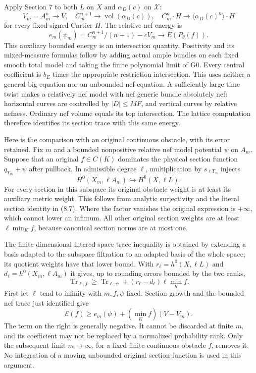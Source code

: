 \documentclass[10pt]{article}
\newcommand{\vol}{\operatorname{vol}}
\begin{document}
Apply Section 7 to both $L$ on $X$ and $\alpha_D(c)$ on $\mathcal X$:
\[
 V_m=A_m^n\to V,\quad C_m^{n+1}\to\vol(\alpha_D(c)),\quad
 C_m^n\cdot H\to\langle\alpha_D(c)^n\rangle\cdot H   \tag{8.5}
\]
for every fixed signed Cartier $H$. The relative nef energy is
\[
 e_m(\psi_m)=C_m^{n+1}/(n+1)-cV_m\longrightarrow E(P_\theta(f)).
                                                               \tag{8.6}
\]
This auxiliary bounded energy is an intersection quantity. Positivity and
its mixed-measure formulas follow by adding actual ample bundles on each
fixed smooth total model and taking the finite polynomial limit of G0.
Every central coefficient is $b_E$ times the appropriate restriction
intersection. This uses neither a general big equation nor an unbounded
nef equation. A sufficiently large time twist makes a relatively nef
model with nef generic bundle absolutely nef: horizontal curves are
controlled by $|D|\leq MF$, and vertical curves by relative nefness.
Ordinary nef volume equals its top intersection. The lattice computation
therefore identifies its section trace with this same energy.

Here is the comparison with an original continuous obstacle, with its
error retained. Fix $m$ and a bounded nonpositive relative nef model
potential $\psi$ on $A_m$. Suppose that an original $f\in C(K)$ dominates
the physical section function $q_{T_m}+\psi$ after pullback. In admissible
degree $\ell$, multiplication by $s_{\ell T_m}$ injects
\[
 H^0(X_m,\ell A_m)\hookrightarrow H^0(X,\ell L).    \tag{8.7}
\]
For every section in this subspace its original obstacle weight is at
least its auxiliary metric weight. This follows from analytic surjectivity
and the literal section identity in (8.7). Where the factor vanishes the
original expression is $+\infty$, which cannot lower an infimum. All
other original section weights are at least $\ell\min_K f$, because
canonical section norms are at most one.

The finite-dimensional filtered-space trace inequality is obtained by
extending a basis adapted to the subspace filtration to an adapted basis
of the whole space; its quotient weights have that lower bound. With
$r_\ell=h^0(X,\ell L)$ and $d_\ell=h^0(X_m,\ell A_m)$ it gives, up to
rounding errors bounded by the two ranks,
\[
 \operatorname{Tr}_{\ell,f}\geq
 \operatorname{Tr}_{\ell,\psi}
             +(r_\ell-d_\ell)\ell\min_K f.         \tag{8.8}
\]
First let $\ell$ tend to infinity with $m,f,\psi$ fixed. Section growth
and the bounded nef trace just identified give
\[
 \mathscr E(f)\geq e_m(\psi)+(\min_K f)(V-V_m).      \tag{8.9}
\]
The term on the right is generally negative. It cannot be discarded at
finite $m$, and its coefficient may not be replaced by a normalized
probability rank. Only the subsequent limit $m\to\infty$, for a fixed
finite continuous obstacle $f$, removes it. No integration of a moving
unbounded original section function is used in this argument.
\end{document}
